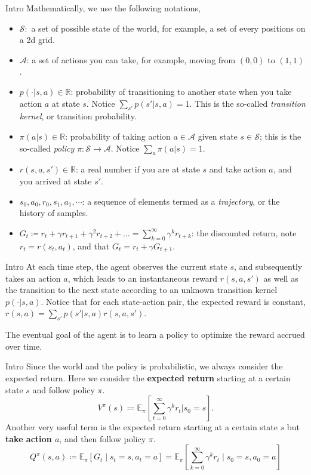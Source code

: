 \documentclass[handout]{beamer}
\begin{document}
\begin{frame}{Intro}
    \small
    Mathematically, we use the following notations,
\begin{itemize}
    \item $\mathcal{S}:$ a set of possible state of the world, for example, a set of every positions on a 2d grid.
    \item $\mathcal{A}$: a set of actions you can take, for example, moving from $(0,0)$ to $(1,1)$.
    \item $p(\cdot|s,a) \in \mathbb{R}$: probability of transitioning to another state when you take action $a$ at state $s$. Notice $\sum_{s'} p(s'|s,a)=1$. This is the so-called \textit{transition kernel}, or transition probability. 
    \item $\pi(a|s)\in \mathbb{R}$: probability of taking action $a\in \mathcal{A}$ given state $s\in \mathcal{S}$; this is the so-called \textit{policy} $\pi: \mathcal{S}\rightarrow \mathcal{A}$. Notice $\sum_{a} \pi(a|s) = 1$.
    \item $r(s,a, s')\in \mathbb{R}$: a real number if you are at state $s$ and take action $a$, and you arrived at state $s'$. 
    \item $s_0, a_0, r_0, s_1, a_1,\cdots$: a sequence of elements termed as a \textit{trajectory}, or the history of samples.
    \item $G_t \coloneqq r_t + \gamma r_{t+1} + \gamma^2 r_{t+2} + \dots = \sum_{k=0}^{\infty} \gamma^{k} r_{t+k}$: the discounted return, note $r_t = r(s_t, a_t)$, and that $G_t = r_t + \gamma G_{t+1}$.
\end{itemize}


\end{frame}

\begin{frame}{Intro}
    At each time step, the agent observes the current state $s$, and subsequently takes an action $a$, which leads to an instantaneous reward $r(s, a, s')$ as well as the transition to the next state according to an unknown transition kernel $p(\cdot | s, a)$. Notice that for each state-action pair, the expected reward is constant, $r(s, a) = \sum_{s'} p(s'|s,a) r(s, a, s')$.
    
    The eventual goal of the agent is to learn a policy to optimize the reward accrued over time. 
\end{frame}

\begin{frame}{Intro}
    \small
    Since the world and the policy is probabilistic, we always consider the expected return. Here we consider the \textbf{expected return} starting at a certain state $s$ and follow policy $\pi$. 
    $$V^{\pi}(s) \coloneqq \mathbb{E}_{\pi} \left[ \sum_{t=0}^{\infty} \gamma^k r_{t} | s_0 = s\right].$$ 
    Another very useful term is the expected return starting at a certain state $s$ but \textbf{take action $a$}, and then follow policy $\pi$. 
    $$Q^{\pi}(s, a) \coloneqq \mathbb{E}_{\pi}\left[G_{t} \mid s_{t}=s, a_{t}=a\right]=\mathbb{E}_{\pi}\left[\sum_{k=0}^{\infty} \gamma^{k} r_{t} \mid s_{0}=s, a_{0}=a\right]$$

\end{frame}
\end{document}
